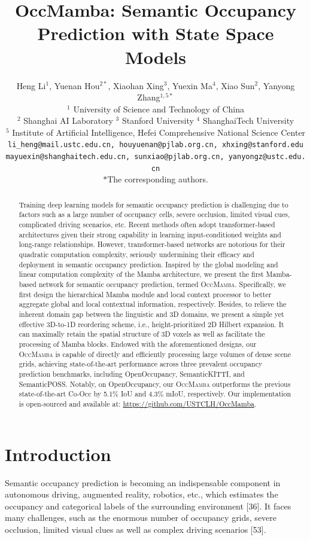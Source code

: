 \documentclass[10pt,twocolumn,letterpaper]{article}
\title{OccMamba: Semantic Occupancy Prediction with State Space Models}
\author{
  Heng Li$^{1}$,\quad
  Yuenan Hou$^{2*}$,\quad
  Xiaohan Xing$^{3}$,\quad
  Yuexin Ma$^{4}$,\quad
  Xiao Sun$^{2}$,\quad
  Yanyong Zhang$^{1,5*}$\\[4pt]
  $^{1}$ University of Science and Technology of China\\
  $^{2}$ Shanghai AI Laboratory\quad
  $^{3}$ Stanford University\quad
  $^{4}$ ShanghaiTech University\\
  $^{5}$ Institute of Artificial Intelligence, Hefei Comprehensive National Science Center\\[2pt]
  \texttt{li\_heng@mail.ustc.edu.cn,\ houyuenan@pjlab.org.cn,\ xhxing@stanford.edu}\\
  \texttt{mayuexin@shanghaitech.edu.cn,\ sunxiao@pjlab.org.cn,\ yanyongz@ustc.edu.cn}\\[2pt]
  \small{$*$The corresponding authors.}
}
\date{}
\newcommand{\methodname}{\textsc{OccMamba}}
\begin{document}
\maketitle

\begin{abstract}
Training deep learning models for semantic occupancy prediction is challenging due to factors such as a large number of occupancy cells, severe occlusion, limited visual cues, complicated driving scenarios, etc. Recent methods often adopt transformer-based architectures given their strong capability in learning input-conditioned weights and long-range relationships. However, transformer-based networks are notorious for their quadratic computation complexity, seriously undermining their efficacy and deployment in semantic occupancy prediction. Inspired by the global modeling and linear computation complexity of the Mamba architecture, we present the first Mamba-based network for semantic occupancy prediction, termed \methodname{}. Specifically, we first design the hierarchical Mamba module and local context processor to better aggregate global and local contextual information, respectively. Besides, to relieve the inherent domain gap between the linguistic and 3D domains, we present a simple yet effective 3D-to-1D reordering scheme, i.e., height-prioritized 2D Hilbert expansion. It can maximally retain the spatial structure of 3D voxels as well as facilitate the processing of Mamba blocks. Endowed with the aforementioned designs, our \methodname{} is capable of directly and efficiently processing large volumes of dense scene grids, achieving state-of-the-art performance across three prevalent occupancy prediction benchmarks, including OpenOccupancy, SemanticKITTI, and SemanticPOSS. Notably, on OpenOccupancy, our \methodname{} outperforms the previous state-of-the-art Co-Occ by 5.1\% IoU and 4.3\% mIoU, respectively. Our implementation is open-sourced and available at: \url{https://github.com/USTCLH/OccMamba}.
\end{abstract}


\section{Introduction}

Semantic occupancy prediction is becoming an indispensable component in autonomous driving, augmented reality, robotics, etc., which estimates the occupancy and categorical labels of the surrounding environment [36]. It faces many challenges, such as the enormous number of occupancy grids, severe occlusion, limited visual clues as well as complex driving scenarios [53].
\end{document}
